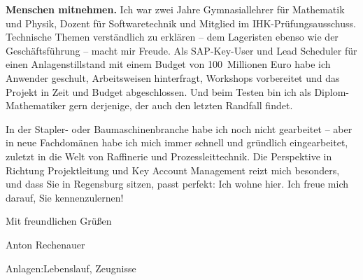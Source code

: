 \documentclass[11pt,a4paper]{article}
\newcommand*{\semibold}{\fontseries{sb}\selectfont}
\newcommand*{\light}{\fontseries{l}\selectfont}
\begin{document}
\textbf{Menschen mitnehmen.} Ich war zwei Jahre Gymnasiallehrer für Mathematik und Physik,
Dozent für Softwaretechnik und Mitglied im IHK-Prüfungsausschuss. Technische Themen
verständlich zu erklären -- dem Lageristen ebenso wie der Geschäftsführung -- macht mir
Freude. Als SAP-Key-User und Lead Scheduler für einen Anlagenstillstand mit einem Budget von
100~Millionen Euro habe ich Anwender geschult, Arbeitsweisen hinterfragt, Workshops
vorbereitet und das Projekt in Zeit und Budget abgeschlossen. Und beim Testen bin ich als
Diplom-Mathematiker gern derjenige, der auch den letzten Randfall findet.

In der Stapler- oder Baumaschinenbranche habe ich noch nicht gearbeitet -- aber in neue
Fachdomänen habe ich mich immer schnell und gründlich eingearbeitet, zuletzt in die Welt von
Raffinerie und Prozessleittechnik. Die Perspektive in Richtung Projektleitung und
Key Account Management reizt mich besonders, und dass Sie in Regensburg sitzen, passt
perfekt: Ich wohne hier.%
%
Ich freue mich darauf, Sie kennenzulernen!

Mit freundlichen Grüßen

\vspace{1.0cm}
Anton Rechenauer

\vfill
{\small\color{muted}\semibold Anlagen:\enspace\light Lebenslauf, Zeugnisse}
\end{document}
